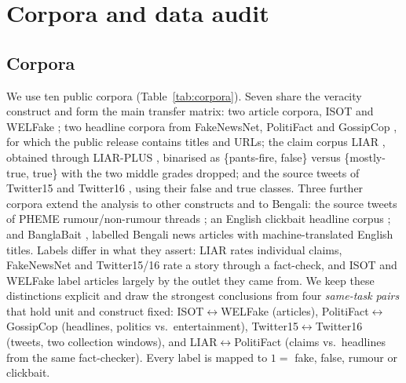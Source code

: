 \section{Corpora and data audit}\label{sec:data}

\subsection{Corpora}
We use ten public corpora (Table~\ref{tab:corpora}). Seven share the veracity construct and form the main transfer matrix: two article corpora, ISOT \citep{ahmed2017isot,ahmed2018isot} and WELFake \citep{verma2021welfake}; two headline corpora from FakeNewsNet, PolitiFact and GossipCop \citep{shu2020fakenewsnet}, for which the public release contains titles and URLs; the claim corpus LIAR \citep{wang2017liar}, obtained through LIAR-PLUS \citep{alhindi2018liarplus}, binarised as \{pants-fire, false\} versus \{mostly-true, true\} with the two middle grades dropped; and the source tweets of Twitter15 and Twitter16 \citep{ma2017kernel}, using their false and true classes. Three further corpora extend the analysis to other constructs and to Bengali: the source tweets of PHEME rumour/non-rumour threads \citep{zubiaga2016phemernr,zubiaga2017context}; an English clickbait headline corpus \citep{chakraborty2016clickbait}; and BanglaBait \citep{mahtab2023banglabait}, \BBraw{} labelled Bengali news articles with machine-translated English titles. Labels differ in what they assert: LIAR rates individual claims, FakeNewsNet and Twitter15/16 rate a story through a fact-check, and ISOT and WELFake label articles largely by the outlet they came from. We keep these distinctions explicit and draw the strongest conclusions from four \emph{same-task pairs} that hold unit and construct fixed: ISOT$\leftrightarrow$WELFake (articles), PolitiFact$\leftrightarrow$GossipCop (headlines, politics vs.\ entertainment), Twitter15$\leftrightarrow$Twitter16 (tweets, two collection windows), and LIAR$\leftrightarrow$PolitiFact (claims vs.\ headlines from the same fact-checker). Every label is mapped to $1=$ fake, false, rumour or clickbait.

